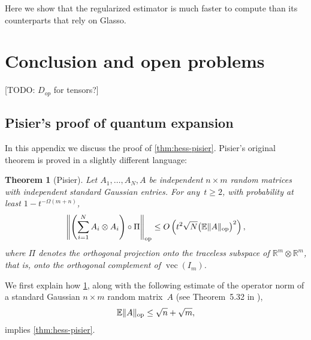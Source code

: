 \documentclass[aos]{imsart}
\newtheorem{theorem}{Theorem}[section]
\theoremstyle{definition}
\numberwithin{equation}{section}
\DeclareMathOperator{\op}{op}
\DeclareMathOperator{\vect}{vec}
\DeclarePairedDelimiter{\norm}{\lVert}{\rVert}
\newcommand{\R}{{\mathbb{R}}}
\newcommand{\ot}{\otimes}
\newcommand{\E}{\mathbb{E}}
\newcommand{\TODO}[1]{{\color{blue}[TODO: #1]}}
\begin{document}
Here we show that the regularized estimator is much faster to compute than its counterparts that rely on Glasso. 

\section{Conclusion and open problems}
\TODO{$D_{op}$ for tensors?}


\begin{appendix}

\section{Pisier's proof of quantum expansion}\label{sec:pisier}
In this appendix we discuss the proof of \cref{thm:hess-pisier}.
Pisier's original theorem is proved in a slightly different language:

\begin{theorem}[Pisier]\label{thm:Pisier-expansion}
Let $A_1,\dots,A_N,A$ be independent $n \times m$ random matrices with independent standard Gaussian entries.
For any~$t \geq 2$, with probability at least $1 - t^{-\Omega(m+n)}$,
\begin{align*}
  \norm*{\left(\sum_{i=1}^N A_i \otimes A_i \right) \circ \Pi}_{\op}
  \leq O\left( t^2 \sqrt{N} \bigl( \E \norm{A}_{\op} \bigr)^2 \right),
\end{align*}
where $\Pi$ denotes the orthogonal projection onto the traceless subspace of $\R^m \ot \R^m$, that is, onto the orthogonal complement of $\vect(I_m)$.
\end{theorem}

We first explain how \cref{thm:Pisier-expansion}, along with the following estimate of the operator norm of a standard Gaussian $n \times m$ random matrix~$A$ (see Theorem~5.32 in \cite{vershynin2010introduction}),
\begin{equation}\label{eq:op norm upper bound}
  \E \norm{A}_{\op} \leq \sqrt{n} + \sqrt{m},
\end{equation}
implies \cref{thm:hess-pisier}.


\end{appendix}
\end{document}
